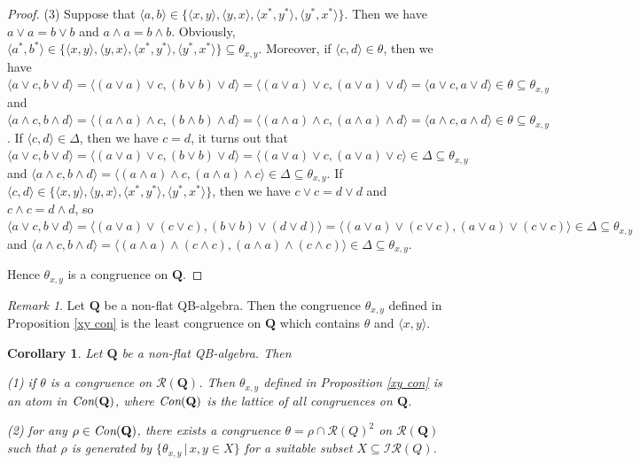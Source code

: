 \documentclass[12pt]{amsart}
\newtheorem{corollary}{Corollary}[section]
\theoremstyle{definition}
\theoremstyle{remark}
\newtheorem{remark}{Remark}[section]
\numberwithin{equation}{section}
\begin{document}
\begin{proof}
(3) Suppose that $\langle a,b\rangle\in \{\langle x,y\rangle, \langle y,x\rangle, \langle x^{\ast},y^{\ast}\rangle, \langle y^{\ast},x^{\ast}\rangle \}$. Then we have $a\vee a=b\vee b$ and $a\wedge a=b\wedge b$. Obviously, $\langle a^{\ast},b^{\ast}\rangle\in \{\langle x,y\rangle, \langle y,x\rangle, \langle x^{\ast},y^{\ast}\rangle,  \langle y^{\ast},x^{\ast}\rangle \}\subseteq \theta_{x,y}$. Moreover, if $\langle c,d\rangle\in \theta$, then we have $\langle a\vee c,b\vee d\rangle=\langle (a\vee a)\vee c,(b\vee b)\vee d\rangle=\langle (a\vee a)\vee c,(a\vee a)\vee d\rangle=\langle a\vee c,a\vee d\rangle\in \theta\subseteq \theta_{x,y}$ and $\langle a\wedge c,b\wedge d\rangle=\langle (a\wedge a)\wedge c,(b\wedge b)\wedge d\rangle=\langle (a\wedge a)\wedge c,(a\wedge a)\wedge d\rangle=\langle a\wedge c,a\wedge d\rangle\in \theta\subseteq \theta_{x,y}$. If $\langle c,d\rangle\in \Delta$, then we have $c=d$, it turns out that $\langle a\vee c,b\vee d\rangle=\langle (a\vee a)\vee c,(b\vee b)\vee d\rangle=\langle (a\vee a)\vee c,(a\vee a)\vee c\rangle\in \Delta\subseteq \theta_{x,y}$ and $\langle a\wedge c,b\wedge d\rangle=\langle (a\wedge a)\wedge c,(a\wedge a)\wedge c\rangle\in \Delta\subseteq \theta_{x,y}$. If $\langle c,d\rangle\in \{\langle x,y\rangle, \langle y,x\rangle, \langle x^{\ast},y^{\ast}\rangle, \langle y^{\ast},x^{\ast}\rangle \}$, then we have $c\vee c=d\vee d$ and $c\wedge c=d\wedge d$, so $\langle a\vee c,b\vee d\rangle=\langle (a\vee a)\vee (c\vee c),(b\vee b)\vee (d\vee d)\rangle=\langle (a\vee a)\vee (c\vee c),(a\vee a)\vee (c\vee c)\rangle\in \Delta\subseteq \theta_{x,y}$ and $\langle a\wedge c,b\wedge d\rangle=\langle (a\wedge a)\wedge (c\wedge c),(a\wedge a)\wedge (c\wedge c)\rangle\in \Delta\subseteq \theta_{x,y}$.

Hence $\theta_{x,y}$ is a congruence on $\mathbf{Q}$.
\end{proof}

\begin{remark} Let $\mathbf{Q}$ be a non-flat QB-algebra. Then the congruence $\theta_{x,y}$ defined in Proposition \ref{xy con} is the least congruence on $\mathbf{Q}$
which contains $\theta$ and $\langle x,y\rangle$.
\end{remark}


\begin{corollary}
Let $\mathbf{Q}$ be a non-flat QB-algebra. Then

\emph{(1)} if $\theta$ is a congruence on $\mathscr{R}(\mathbf{Q})$. Then $\theta_{x,y}$ defined in Proposition \ref{xy con} is an atom in $\emph{Con}(\mathbf{Q})$, where $\emph{Con}(\mathbf{Q})$ is the lattice of all congruences on $\mathbf{Q}$.

\emph{(2)} for any $\rho\in \emph{Con}(\mathbf{Q})$, there exists a congruence $\theta=\rho\cap \mathscr{R}(Q)^{2}$ on $\mathscr{R}(\mathbf{Q})$ such that $\rho$ is generated by $\{\theta_{x,y}\,|\, x,y\in X\}$ for a suitable subset $X\subseteq \mathscr{IR}(Q)$.
\end{corollary}
\end{document}
